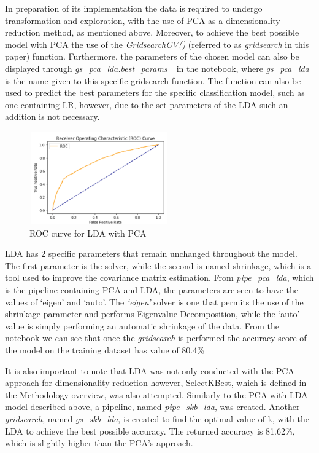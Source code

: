 \documentclass{article}
\begin{document}
In preparation of its implementation the data is required to undergo transformation and exploration, with the use of PCA as a dimensionality reduction method, as mentioned above. Moreover, to achieve the best possible model with PCA the use of the \textit{GridsearchCV()} (referred to as \textit{gridsearch} in this paper) function. Furthermore, the parameters of the chosen model can also be displayed through \textit{gs\_pca\_lda.best\_params\_} in the notebook, where \textit{gs\_pca\_lda} is the name given to this specific gridsearch function. The function can also be used to predict the best parameters for the specific classification model, such as one containing LR, however, due to the set parameters of the LDA such an addition is not necessary. 

\begin{figure}[h]
 \centering
 \includegraphics[width=6cm, height=4cm]{lda-roc.png}
 \caption{ROC curve for LDA with PCA}
\end{figure}
							
LDA has 2 specific parameters that remain unchanged throughout the model. The first parameter is the solver, while the second is named shrinkage, which is a tool used to improve the covariance matrix estimation. From \textit{pipe\_pca\_lda}, which is the pipeline containing PCA and LDA, the parameters are seen to have the values of ‘eigen’ and ‘auto’. The \textit{‘eigen’} solver is one that permits the use of the shrinkage parameter and performs Eigenvalue Decomposition, while the ‘auto’ value is simply performing an automatic shrinkage of the data. From the notebook we can see that once the \textit{gridsearch} is performed the accuracy score of the model on the training dataset has value of 80.4\%

It is also important to note that LDA was not only conducted with the PCA approach for dimensionality reduction however, SelectKBest, which is defined in the Methodology overview, was also attempted. Similarly to the PCA with LDA model described above, a pipeline, named \textit{pipe\_skb\_lda}, was created. Another \textit{gridsearch}, named \textit{gs\_skb\_lda}, is created to find the optimal value of k, with the LDA to achieve the best possible accuracy. The returned accuracy is 81.62\%, which is slightly higher than the PCA’s approach. 
\end{document}

